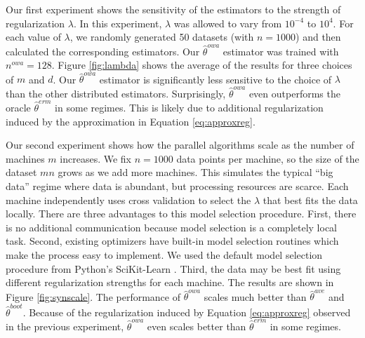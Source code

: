 \documentclass[twoside]{article}
\newcommand{\nowa}{n^{\textit{owa}}}
\newcommand{\w}{\theta}
\newcommand{\wowa}{\hat\w^{owa}}
\newcommand{\wave}{\hat\w^{ave}}
\newcommand{\wboot}{\hat\w^{boot}}
\newcommand{\wmle}{\hat\w^{erm}}
\begin{document}
Our first experiment shows the sensitivity of the estimators to the strength of regularization $\lambda$.
In this experiment, $\lambda$ was allowed to vary from $10^{-4}$ to $10^4$.
For each value of $\lambda$, we randomly generated 50 datasets (with $n=1000$) and then calculated the corresponding estimators.
Our $\wowa$ estimator was trained with $\nowa=128$.
Figure \ref{fig:lambda} shows the average of the results for three choices of $m$ and $d$.
Our $\wowa$ estimator is significantly less sensitive to the choice of $\lambda$ than the other distributed estimators.
Surprisingly, $\wowa$ even outperforms the oracle $\wmle$ in some regimes.
This is likely due to additional regularization induced by the approximation in Equation \ref{eq:approxreg}.

Our second experiment shows how the parallel algorithms scale as the number of machines $m$ increases.
We fix $n=1000$ data points per machine,
so the size of the dataset $mn$ grows as we add more machines.
This simulates the typical ``big data'' regime where data is abundant,
but processing resources are scarce.
Each machine independently uses cross validation to select the $\lambda$ that best fits the data locally.
There are three advantages to this model selection procedure.
First, there is no additional communication because model selection is a completely local task.
Second, existing optimizers have built-in model selection routines which make the process easy to implement.
We used the default model selection procedure from Python's SciKit-Learn \citep{scikit-learn}.
Third, the data may be best fit using different regularization strengths for each machine.
The results are shown in Figure \ref{fig:synscale}.
The performance of $\wowa$ scales much better than $\wave$ and $\wboot$.
Because of the regularization induced by Equation \ref{eq:approxreg} observed in the previous experiment,
$\wowa$ even scales better than $\wmle$ in some regimes.
\end{document}
